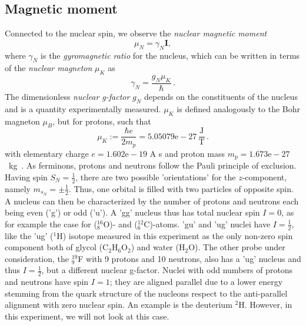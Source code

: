 \subsection{Magnetic moment}
Connected to the nuclear spin, we observe the \emph{nuclear magnetic moment}
\begin{equation}
    \mu_N = \gamma_N \mathbf{I},
\end{equation}
where $\gamma_N$ is the \emph{gyromagnetic ratio} for the nucleus, which 
can be written in terms of the \emph{nuclear magneton} $\mu_K$
as
\begin{equation}
    \gamma_N = \frac{g_N \mu_K}{\hbar} \, .
    \label{eq:gamma}
\end{equation}
The dimensionless \emph{nuclear g-factor} $g_N$ depends on the constituents of the 
nucleus and is a quantity experimentally measured. $\mu_K$ is defined 
analogously to the Bohr magneton $\mu_B$, but for protons, such that 
\begin{equation}
    \mu_K := \frac{\hbar e}{2 m_p} = 5.05079\mathrm{e}-27 \, \mathrm{\frac{J}{T}}\, .
\end{equation}
with elementary charge $e = 1.602\mathrm{e}-19$ A s 
and proton mass $m_p = 1.673\mathrm{e}-27$~kg~\cite{Demtroeder1}.
As ferminons, protons and neutrons follow the Pauli principle of exclusion. 
Having spin $S_N = \frac{1}{2}$, there are two possible 'orientations' for 
the $z$-component, namely $m_{s_N} = \pm \frac{1}{2}$. Thus, one orbital 
is filled with two particles of opposite spin. A nucleus can then be 
characterized by the number of protons and neutrons each being 
even ('g') or odd ('u'). A 'gg' nucleus thus has total nuclear spin $I = 0$, 
as for example the case for ($_8^{16}$O)- and ($_6^{12}$C)-atoms. 
'gu' and 'ug' nuclei have $I = \frac{1}{2}$, like the 'ug' ($^1$H) isotope 
measured in this experiment as the only non-zero spin component both of 
glycol (C$_2$H$_6$O$_2$) and water (H$_2$O). The other probe under consideration, 
the $_9^{19}$F with 9 protons and 10 neutrons, 
also has a 'ug' nucleus and thus $I = \frac{1}{2}$, but a different nuclear g-factor. 
Nuclei with odd numbers of 
protons and neutrons have spin $I = 1$; they are aligned parallel due to a lower 
energy stemming from the quark structure of the nucleons respect to the anti-parallel 
alignment with zero nuclear spin. An example is the deuterium $^2$H. However, in this 
experiment, we will not look at this case. 

